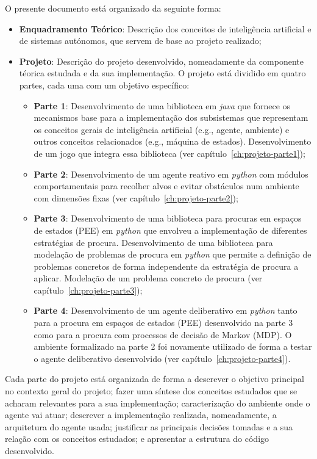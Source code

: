 O presente documento está organizado da seguinte forma:
\begin{itemize}
    \item \textbf{Enquadramento Teórico}: Descrição dos conceitos de inteligência artificial e de sistemas autónomos, que servem de base ao projeto realizado;
    \item \textbf{Projeto}: Descrição do projeto desenvolvido, nomeadamente da componente téorica estudada e da sua implementação.
    O projeto está dividido em quatro partes, cada uma com um objetivo específico:
    \begin{itemize}
        \item \textbf{Parte 1}: Desenvolvimento de uma biblioteca em \textit{java} que fornece os mecanismos base para a implementação dos subsistemas que representam os conceitos gerais de inteligência artificial (e.g., agente, ambiente) e outros conceitos relacionados (e.g., máquina de estados). Desenvolvimento de um jogo que integra essa biblioteca (ver capítulo~\ref{ch:projeto-parte1});
        \item \textbf{Parte 2}: Desenvolvimento de um agente reativo em \textit{python} com módulos comportamentais para recolher alvos e evitar obstáculos num ambiente com dimensões fixas (ver capítulo~\ref{ch:projeto-parte2});
        \item \textbf{Parte 3}: Desenvolvimento de uma biblioteca para procuras em espaços de estados (PEE) em \textit{python} que envolveu a implementação de diferentes estratégias de procura. Desenvolvimento de uma biblioteca para modelação de problemas de procura em \textit{python} que permite a definição de problemas concretos de forma independente da estratégia de procura a aplicar. Modelação de um problema concreto de procura (ver capítulo~\ref{ch:projeto-parte3});
        \item \textbf{Parte 4}: Desenvolvimento de um agente deliberativo em \textit{python} tanto para a procura em espaços de estados (PEE) desenvolvido na parte 3 como para a procura com processos de decisão de Markov (MDP).
        O ambiente formalizado na parte 2 foi novamente utilizado de forma a testar o agente deliberativo desenvolvido (ver capítulo~\ref{ch:projeto-parte4}).
    \end{itemize}
\end{itemize}

Cada parte do projeto está organizada de forma a descrever o objetivo principal no contexto geral do projeto; fazer uma síntese dos conceitos estudados que se acharam relevantes para a sua implementação; caracterização do ambiente onde o agente vai atuar; descrever a implementação realizada, nomeadamente, a arquitetura do agente usada; justificar as principais decisões tomadas e a sua relação com os conceitos estudados; e apresentar a estrutura do código desenvolvido.

